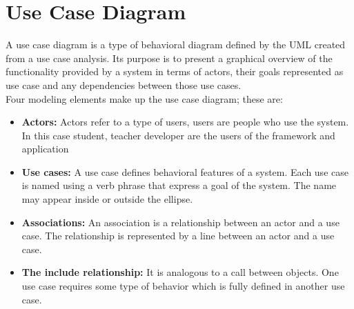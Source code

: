 \documentclass[openany,12pt]{report}
\begin{document}
\section{Use Case Diagram}
\hspace*{0.5in} A use case diagram is a type of behavioral diagram defined by the UML created from a use case analysis. Its purpose is to present a graphical overview of the functionality provided by a system in terms of actors, their goals represented as use case and any dependencies between those use cases.\\
\hspace*{0.5in}Four modeling elements make up the use case diagram; these are:\\
\begin{itemize}
\item{\textbf{Actors:} Actors refer to a type of users, users are people who use the system. In this case student, teacher developer are the users of the framework and application}
\item{\textbf{Use cases:} A use case defines behavioral features of a system. Each use case is named using a verb phrase that express a goal of the system. The name may appear inside or outside the ellipse.}
\item{\textbf{Associations:} An association is a relationship between an actor and a use case. The relationship is represented by a line between an actor and a use case.}
\item{\textbf{The include relationship:} It is analogous to a call between objects. One use case requires some type of behavior which is fully defined in  another use case.}
\end{itemize}
\newpage
\end{document}
